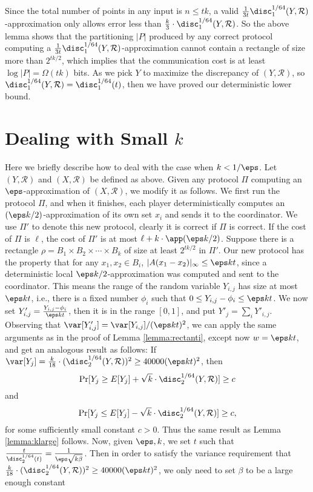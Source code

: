 Since the total number of points in any input is $n\le tk$, a valid $\frac{1}{3t}
\disc_1^{1/64}(Y,\mathcal{R})$-approximation only allows error less than $\frac{k}{3}\cdot
\disc_1^{1/64}(Y,\mathcal{R})$. So the above lemma shows that the partitioning $|P|$
produced by any correct protocol computing a $\frac{1}{3t}
\disc_1^{1/64}(Y,\mathcal{R})$-approximation cannot contain a rectangle of size more than
$2^{tk/2}$, which implies that the communication cost is at least $\log|P|=\Omega(tk)$
bits.  As we pick $Y$ to maximize the discrepancy of $(Y, \mathcal{R})$, so
$\disc_1^{1/64}(Y,\mathcal{R})=\disc_1^{1/64}(t)$, then we have proved our deterministic
lower bound.





\section{Dealing with Small $k$}\label{app:smallk}
Here we briefly describe how to deal with the case when $k<1/\eps$. Let $(Y,\mathcal{R})$ and $(X,\mathcal{R})$ be defined as above. Given any protocol $\Pi$ computing an $\eps$-approximation of $(X,\mathcal{R})$, we modify it as follows. We first run the protocol $\Pi$, and when it finishes, each player deterministically computes an $(\eps k/2)$-approximation of its own set $x_i$ and sends it to the coordinator. We use $\Pi'$ to denote this new protocol, clearly it is correct if $\Pi$ is correct. If the cost of $\Pi$ is $\ell$, the cost of $\Pi'$ is at most $\ell+k\cdot \app(\eps k/2)$. Suppose there is a rectangle $\rho=B_1\times B_2\times \cdots \times B_k$ of size at least $2^{tk/2}$ in $\Pi'$. Our new protocol has the property that for any $x_1,x_2\in B_i$, $|A(x_1-x_2)|_\infty \le \eps k t $, since a deterministic local $\eps k/2$-approximation was computed and sent to the coordinator. This means the range of the random variable $Y_{i,j}$ has size at most $\eps kt$, i.e., there is a fixed number $\phi_i$ such that $0\le Y_{i,j}-\phi_i\le \eps k t$. We now set $Y_{i, j}' = \frac{Y_{i,j}-\phi_i}{\eps k t}$, then it is in the range $[0,1]$, and put $Y'_j=\sum_i Y'_{i,j}$. Observing that $\var[Y'_{i,j}]=\var[Y_{i,j}]/(\eps kt)^2$, we can apply the same arguments as in the proof of Lemma \ref{lemma:rectanti}, except now $w=\eps k t$, and get an analogous result as follows:
If $\var[Y_j]=\frac{k}{18}\cdot (\disc_2^{1/64}(Y,\mathcal{R}))^2\ge 40000(\eps k t)^2$, then 
$$\Pr[Y_j\ge E[Y_j]+ \sqrt{k}\cdot \disc_2^{1/64}(Y,\mathcal{R})] \ge c$$
and 
$$ \Pr[Y_j\le E[Y_j]- \sqrt{k}\cdot \disc_2^{1/64}(Y,\mathcal{R})] \ge c,$$
for some sufficiently small constant $c>0$. Thus the same result as Lemma \ref{lemma:klarge} follows. Now, given $\eps, k$, we set $t$ such that $\frac{t}{\disc_2^{1/64}(t)} = \frac{1}{\eps \sqrt{k\beta}}$. Then in order to satisfy the variance requirement that $\frac{k}{18}\cdot (\disc_2^{1/64}(Y,\mathcal{R}))^2\ge 40000(\eps k t)^2$, we only need to set $\beta$ to be a large enough constant
